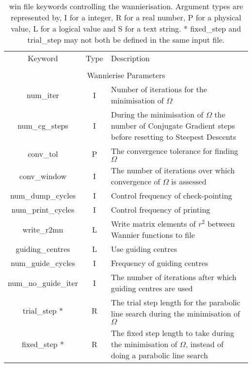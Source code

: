 \begin{table}
\begin{center}
\begin{tabular}{|c|c|p{6cm}|}
\hline
Keyword & Type & Description \\
        &      &             \\
\hline\hline
\multicolumn{3}{|c|}{Wannierise Parameters} \\
\hline
{\sc num\_iter }   & I & Number of iterations for the minimisation
of $\Omega$ \\
{\sc num\_cg\_steps }   & I & During the minimisation
of $\Omega$ the number of Conjugate Gradient steps before resetting to
Steepest Descents \\
{\sc conv\_tol }   & P &The convergence tolerance for finding $\Omega$  \\
{\sc conv\_window }   & I & The number of iterations over which
convergence of $\Omega$ is assessed \\
{\sc num\_dump\_cycles }   & I & Control frequency of check-pointing \\
{\sc num\_print\_cycles }   & I & Control frequency of printing \\
{\sc write\_r2mn }   & L & Write matrix elements of $r^2$ between
Wannier functions to file \\
{\sc guiding\_centres }   & L & Use guiding centres \\
{\sc num\_guide\_cycles }   & I & Frequency of guiding centres \\
{\sc num\_no\_guide\_iter }   & I & The number of iterations
after which guiding centres are used\\
{\sc trial\_step }*   & R & The trial step length for the parabolic
line search during the minimisation
of $\Omega$\\
{\sc fixed\_step }*   & R & The fixed step length to take during the minimisation
of $\Omega$, instead of doing a parabolic line search \\
\hline
\end{tabular}
\caption[Parameter file keywords controlling the Wannierise routine.]
{win file keywords controlling the wannierisation.  Argument types
are represented by, I for a integer, R for a real number, P for a
physical value, L for a logical value and S for a text string. 
{\footnotesize
* {\sc fixed\_step } and  {\sc trial\_step } may not both be defined in
the same input file. }}
\label{parameter_keywords5}
\end{center}
\end{table}



